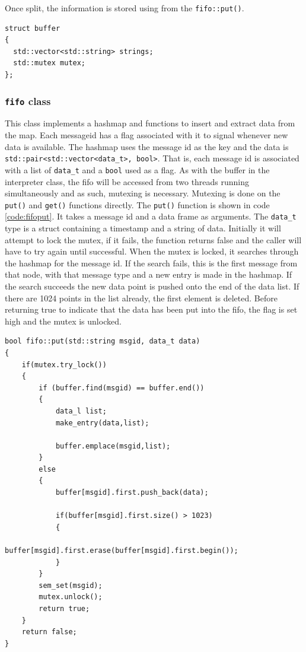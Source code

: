 Once split, the information is stored using from the \texttt{fifo::put()}. 
\begin{lstlisting}[caption=Buffer for holding incoming messages.,label=code:msgbuffer]
struct buffer 
{
  std::vector<std::string> strings;
  std::mutex mutex;
};
\end{lstlisting}
\subsubsection*{\texttt{fifo} class}
This class implements a hashmap and functions to insert and extract data from the map.
Each messageid has a flag associated with it to signal whenever new data is available.
The hashmap uses the message id as the key and the data is \texttt{std::pair<std::vector<data\_t>, bool>}.
That is, each message id is associated with a list of \texttt{data\_t} and a \texttt{bool} used as a flag.
As with the buffer in the interpreter class, the fifo will be accessed from two threads running simultaneously and as such, mutexing is necessary.
Mutexing is done on the \texttt{put()} and \texttt{get()} functions directly.
The \texttt{put()} function is shown in code \ref{code:fifoput}.
It takes a message id and a data frame as arguments.
The \texttt{data\_t} type is a struct containing a timestamp and a string of data.
Initially it will attempt to lock the mutex, if it fails, the function returns false and the caller will have to try again until successful.
When the mutex is locked, it searches through the hashmap for the message id.
If the search fails, this is the first message from that node, with that message type and a new entry is made in the hashmap.
If the search succeeds the new data point is pushed onto the end of the data list.
If there are 1024 points in the list already, the first element is deleted.
Before returning true to indicate that the data has been put into the fifo, the flag is set high and the mutex is unlocked.

\begin{lstlisting}[caption=Function used to insert new data into the hashmap.,label=code:fifoput]
bool fifo::put(std::string msgid, data_t data)
{
	if(mutex.try_lock())
	{	
		if (buffer.find(msgid) == buffer.end())
		{
			data_l list;
			make_entry(data,list);

			buffer.emplace(msgid,list);
		}
		else
		{
			buffer[msgid].first.push_back(data);
			
			if(buffer[msgid].first.size() > 1023)
			{
				buffer[msgid].first.erase(buffer[msgid].first.begin());
			}
		}
		sem_set(msgid);
		mutex.unlock();
		return true;
	}
	return false;
}
\end{lstlisting}


